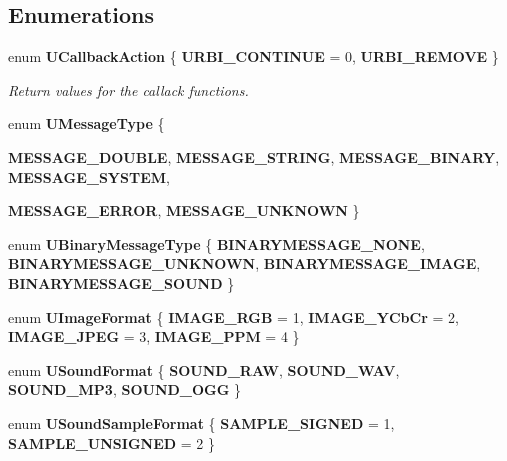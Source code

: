 \subsection*{Enumerations}
\begin{CompactItemize}
\item 
enum {\bf UCallback\-Action} \{ {\bf URBI\_\-CONTINUE} = 0, 
{\bf URBI\_\-REMOVE}
 \}
\begin{CompactList}\small\item\em Return values for the callack functions. \item\end{CompactList}\item 
enum {\bf UMessage\-Type} \{ \par
{\bf MESSAGE\_\-DOUBLE}, 
{\bf MESSAGE\_\-STRING}, 
{\bf MESSAGE\_\-BINARY}, 
{\bf MESSAGE\_\-SYSTEM}, 
\par
{\bf MESSAGE\_\-ERROR}, 
{\bf MESSAGE\_\-UNKNOWN}
 \}
\item 
enum {\bf UBinary\-Message\-Type} \{ {\bf BINARYMESSAGE\_\-NONE}, 
{\bf BINARYMESSAGE\_\-UNKNOWN}, 
{\bf BINARYMESSAGE\_\-IMAGE}, 
{\bf BINARYMESSAGE\_\-SOUND}
 \}
\item 
enum {\bf UImage\-Format} \{ {\bf IMAGE\_\-RGB} = 1, 
{\bf IMAGE\_\-YCb\-Cr} = 2, 
{\bf IMAGE\_\-JPEG} = 3, 
{\bf IMAGE\_\-PPM} = 4
 \}
\item 
enum {\bf USound\-Format} \{ {\bf SOUND\_\-RAW}, 
{\bf SOUND\_\-WAV}, 
{\bf SOUND\_\-MP3}, 
{\bf SOUND\_\-OGG}
 \}
\item 
enum {\bf USound\-Sample\-Format} \{ {\bf SAMPLE\_\-SIGNED} = 1, 
{\bf SAMPLE\_\-UNSIGNED} = 2
 \}
\end{CompactItemize}
